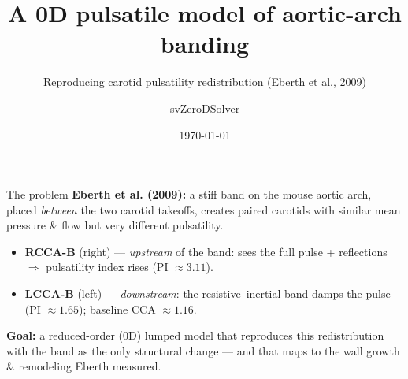 \documentclass[aspectratio=169]{beamer}
\title[0D aortic banding]{A 0D pulsatile model of aortic-arch banding}
\subtitle{Reproducing carotid pulsatility redistribution (Eberth et al., 2009)}
\author{svZeroDSolver}
\date{\today}
\begin{document}
\begin{frame}\titlepage\end{frame}

\begin{frame}{The problem}
\textbf{Eberth et al. (2009):} a stiff band on the mouse aortic arch, placed
\emph{between} the two carotid takeoffs, creates paired carotids with
\alert{similar mean pressure \& flow but very different pulsatility}.
\begin{itemize}
  \item \textbf{RCCA-B} (right) — \emph{upstream} of the band: sees the full pulse
        + reflections $\Rightarrow$ pulsatility index rises (PI $\approx 3.11$).
  \item \textbf{LCCA-B} (left) — \emph{downstream}: the resistive--inertial band
        damps the pulse (PI $\approx 1.65$); baseline CCA $\approx 1.16$.
\end{itemize}
\vspace{1em}
\textbf{Goal:} a reduced-order (0D) lumped model that reproduces this
redistribution with the band as the only structural change --- and that maps to
the wall growth \& remodeling Eberth measured.
\end{frame}
\end{document}

